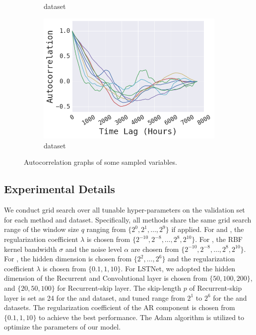 \begin{figure}[!ht]
\begin{subfigure}{.23\textwidth}
  \caption{\electricity dataset}
\end{subfigure}
\begin{subfigure}{.23\textwidth}
  \centering
  \includegraphics[width=\linewidth]{fig-auto/autocorr_exchange.png}
  \caption{\exchange dataset}
\end{subfigure}
\caption{Autocorrelation graphs of some sampled variables.}
\label{fig:autocorrelation}
\end{figure}




\subsection{Experimental Details}
We conduct grid search over all tunable hyper-parameters on the validation set for each method and dataset. Specifically, all methods share the same grid search range of the window size $q$ ranging from $\{2^0,2^1,\ldots,2^9\}$ if applied. For \LRidge and \LSVR, the regularization coefficient $\lambda$ is chosen from $\{2^{-10}, 2^{-8}, \ldots, 2^{8}, 2^{10}\}$. For \GP, the RBF kernel bandwidth $\sigma$ and the noise level $\alpha$ are chosen from $\{2^{-10}, 2^{-8}, \ldots, 2^{8}, 2^{10}\}$. For \TRMF, the hidden dimension is chosen from $\{2^2, \ldots, 2^6\}$ and the regularization coefficient $\lambda$ is chosen from $\{0.1, 1, 10\}$.  For LSTNet, we adopted the hidden dimension of the Recurrent and Convolutional layer is chosen from $\{50,100,200\}$, and $\{20,50,100\}$ for Recurrent-skip layer. The skip-length $p$ of Recurrent-skip layer is set as 24 for the \traffic and \electricity dataset, and tuned range from $2^1$ to $2^6$ for the \solar and \exchange datasets. The regularization coefficient of the AR component is chosen from $\{0.1,1,10\}$ to achieve the best performance. The Adam\cite{kingma2014adam} algorithm is utilized to optimize the parameters of our model.


